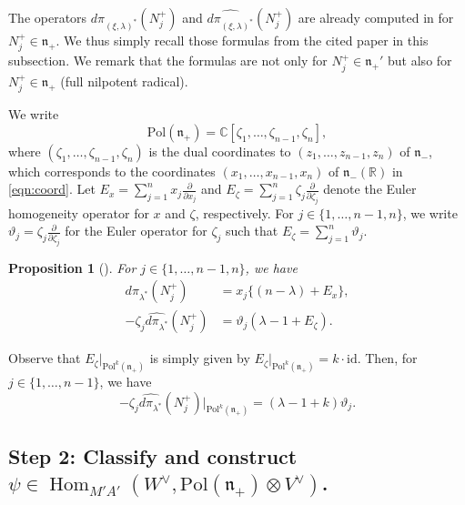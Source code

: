 \documentclass[reqno,11pt]{amsart}
\newtheorem{prop}[equation]{Proposition}
\theoremstyle{remark}
\theoremstyle{definition}
\numberwithin{equation}{section}
\newcommand{\fn}{{\mathfrak n}}
\newcommand{\R}{\mathbb{R}}
\newcommand{\C}{\mathbb{C}}
\newcommand{\Hom}{\operatorname{Hom}}
\newcommand{\Pol}{\mathrm{Pol}}
\newcommand{\dpi}{d\pi}
\newcommand{\id}{\mathrm{id}}
\begin{document}
The operators
$d\pi_{(\xi,\lambda)^*}(N_j^+)$ and 
$\widehat{d\pi_{(\xi,\lambda)^*}}(N_j^+)$
are already computed in \cite[Sect.\ 5]{KuOr24} for $N_j^+ \in \fn_+$.
We thus simply recall those formulas from the cited paper in this subsection.
We remark that the formulas are not only for 
$N_j^+ \in \fn_+'$ but also for $N_j^+ \in \fn_+$ (full nilpotent radical).

We write
\begin{equation*}
\Pol(\fn_+) = \C[\zeta_1, \ldots, \zeta_{n-1}, \zeta_n],
\end{equation*}
where $(\zeta_1, \ldots, \zeta_{n-1}, \zeta_n)$ is 
the dual coordinates to
$(z_1, \ldots, z_{n-1}, z_n)$ of $\fn_-$, which
corresponds to the coordinates 
$(x_1, \ldots, x_{n-1}, x_n)$ of $\fn_-(\R)$ in \eqref{eqn:coord}.
Let 
$E_x = \sum_{j=1}^{n} x_j\frac{\partial}{\partial x_j}$ 
and
$E_\zeta = \sum_{j=1}^{n} \zeta_j\frac{\partial}{\partial \zeta_j}$
denote
the Euler homogeneity operator for $x$ and $\zeta$, respectively.
For $j \in \{1,\ldots, n-1,n\}$,
we write $\vartheta_j = \zeta_j \frac{\partial}{\partial \zeta_j}$ 
for the Euler operator for $\zeta_j$ such that 
$E_\zeta = \sum_{j=1}^{n} \vartheta_j$.


\begin{prop}[{\cite[Props.\ 5.1 and 5.4]{KuOr24}}]\label{prop:dNj1}
For $j \in \{1, \ldots, n-1, n\}$, we have 
\begin{align}%
d\pi_{\lambda^*}(N_j^+)
&=x_j\{ (n-\lambda) 
+E_x\},\nonumber \\[3pt] 
-\zeta_j
\widehat{\dpi_{\lambda^*}}(N_j^+)
&=\vartheta_j(\lambda -1 + E_\zeta).
\end{align} 
\end{prop}

Observe that $E_\zeta\vert_{\Pol^k(\fn_+)}$ is simply given by
$E_\zeta\vert_{\Pol^k(\fn_+)} = k \cdot \id$. 
Then, for $j \in \{1, \ldots, n-1\}$, 
 we have
\begin{equation}\label{eqn:dNj3}
-\zeta_j\widehat{\dpi_{\lambda^*}}(N_j^+)\vert_{\Pol^k(\fn_+)}
=(\lambda-1+k)\vartheta_j.
\end{equation}

\subsection{Step 2: 
Classify and construct 
$\psi \in \Hom_{M'A'}(W^\vee, \Pol(\fn_+)\otimes V^\vee)$.
}
\end{document}
